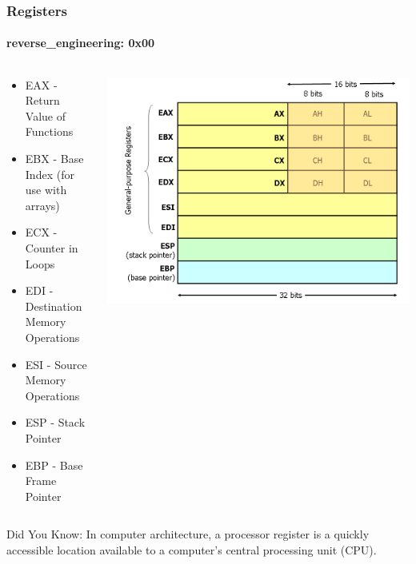 \documentclass[aspectratio=169]{beamer}
\begin{document}
\begin{frame}
  \frametitle{Registers}
  \framesubtitle{reverse\_engineering: 0x00}
  \begin{columns}
    \begin{column}{.50\textwidth}
      \begin{itemize}
      \item{EAX - Return Value of Functions}
      \item{EBX - Base Index (for use with arrays)}
      \item{ECX - Counter in Loops}
      \item{EDI - Destination Memory Operations}
      \item{ESI - Source Memory Operations}
      \item{ESP - Stack Pointer}
      \item{EBP - Base Frame Pointer}
      \end{itemize}
    \end{column}
    \hfill
    \begin{column}{.50\textwidth}
      \begin{center}
        \includegraphics[scale=0.25]{x86-registers}
      \end{center}
    \end{column}
  \end{columns}
  \bigskip
  Did You Know: In computer architecture, a processor register is a quickly accessible location available to a computer's central processing unit (CPU).
\end{frame}
\end{document}
